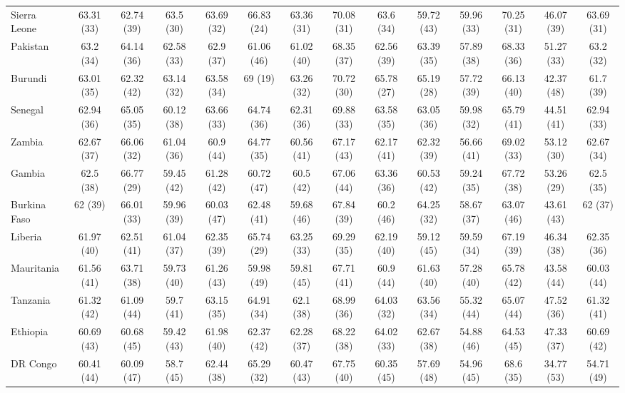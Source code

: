 \begin{landscape}
{\begin{longtable}{lccccccccccccc}
Sierra Leone & 63.31 (33) & 62.74 (39) & 63.5 (30) & 63.69 (32) & 66.83 (24) & 63.36 (31) & 70.08 (31) & 63.6 (34) & 59.72 (43) & 59.96 (33) & 70.25 (31) & 46.07 (39) & 63.69 (31) \\ 
Pakistan & 63.2 (34) & 64.14 (36) & 62.58 (33) & 62.9 (37) & 61.06 (46) & 61.02 (40) & 68.35 (37) & 62.56 (39) & 63.39 (35) & 57.89 (38) & 68.33 (36) & 51.27 (33) & 63.2 (32) \\ 
Burundi & 63.01 (35) & 62.32 (42) & 63.14 (32) & 63.58 (34) & 69 (19) & 63.26 (32) & 70.72 (30) & 65.78 (27) & 65.19 (28) & 57.72 (39) & 66.13 (40) & 42.37 (48) & 61.7 (39) \\ 
Senegal & 62.94 (36) & 65.05 (35) & 60.12 (38) & 63.66 (33) & 64.74 (36) & 62.31 (36) & 69.88 (33) & 63.58 (35) & 63.05 (36) & 59.98 (32) & 65.79 (41) & 44.51 (41) & 62.94 (33) \\ 
Zambia & 62.67 (37) & 66.06 (32) & 61.04 (36) & 60.9 (44) & 64.77 (35) & 60.56 (41) & 67.17 (43) & 62.17 (41) & 62.32 (39) & 56.66 (41) & 69.02 (33) & 53.12 (30) & 62.67 (34) \\ 
Gambia & 62.5 (38) & 66.77 (29) & 59.45 (42) & 61.28 (42) & 60.72 (47) & 60.5 (42) & 67.06 (44) & 63.36 (36) & 60.53 (42) & 59.24 (35) & 67.72 (38) & 53.26 (29) & 62.5 (35) \\ 
Burkina Faso & 62 (39) & 66.01 (33) & 59.96 (39) & 60.03 (47) & 62.48 (41) & 59.68 (46) & 67.84 (39) & 60.2 (46) & 64.25 (32) & 58.67 (37) & 63.07 (46) & 43.61 (43) & 62 (37) \\ 
Liberia & 61.97 (40) & 62.51 (41) & 61.04 (37) & 62.35 (39) & 65.74 (29) & 63.25 (33) & 69.29 (35) & 62.19 (40) & 59.12 (45) & 59.59 (34) & 67.19 (39) & 46.34 (38) & 62.35 (36) \\ 
Mauritania & 61.56 (41) & 63.71 (38) & 59.73 (40) & 61.26 (43) & 59.98 (49) & 59.81 (45) & 67.71 (41) & 60.9 (44) & 61.63 (40) & 57.28 (40) & 65.78 (42) & 43.58 (44) & 60.03 (44) \\ 
Tanzania & 61.32 (42) & 61.09 (44) & 59.7 (41) & 63.15 (35) & 64.91 (34) & 62.1 (38) & 68.99 (36) & 64.03 (32) & 63.56 (34) & 55.32 (44) & 65.07 (44) & 47.52 (36) & 61.32 (41) \\ 
Ethiopia & 60.69 (43) & 60.68 (45) & 59.42 (43) & 61.98 (40) & 62.37 (42) & 62.28 (37) & 68.22 (38) & 64.02 (33) & 62.67 (38) & 54.88 (46) & 64.53 (45) & 47.33 (37) & 60.69 (42) \\ 
DR Congo & 60.41 (44) & 60.09 (47) & 58.7 (45) & 62.44 (38) & 65.29 (32) & 60.47 (43) & 67.75 (40) & 60.35 (45) & 57.69 (48) & 54.96 (45) & 68.6 (35) & 34.77 (53) & 54.71 (49) \\ 

\end{longtable}}
\end{landscape}
